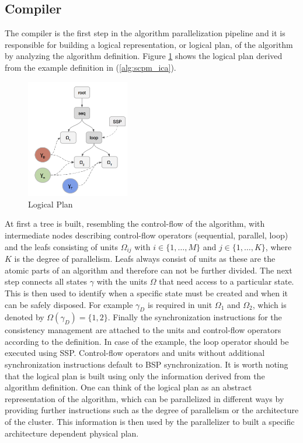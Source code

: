 \subsection{Compiler}
The compiler is the first step in the algorithm parallelization pipeline and it is responsible for building a logical representation, or logical plan, of the algorithm by analyzing the algorithm definition.
Figure \ref{fig:logical_plan} shows the logical plan derived from the example definition in (\ref{alg:scpm_ica}).
\begin{figure}[ht]
\centering
\includegraphics[width=0.4\textwidth]{img/logical_plan.png}
\caption{Logical Plan}
\label{fig:logical_plan}
\end{figure}
At first a tree is built, resembling the control-flow of the algorithm, with intermediate nodes describing control-flow operators (sequential, parallel, loop) and the leafs consisting of units $\Omega_{ij}$ with $i \in \{1, \ldots, M\}$ and $j \in \{1, \ldots, K\}$, where $K$ is the degree of parallelism.
Leafs always consist of units as these are the atomic parts of an algorithm and therefore can not be further divided.
The next step connects all states $\gamma$ with the units $\Omega$ that need access to a particular state.
This is then used to identify when a specific state must be created and when it can be safely disposed.
For example $\gamma_D$ is required in unit $\Omega_1$ and $\Omega_2$, which is denoted by $\Omega(\gamma_D) = \{1, 2\}$.
Finally the synchronization instructions for the consistency management are attached to the units and control-flow operators according to the definition.
In case of the example, the loop operator should be executed using SSP.
Control-flow operators and units without additional synchronization instructions default to BSP synchronization.
It is worth noting that the logical plan is built using only the information derived from the algorithm definition.
One can think of the logical plan as an abstract representation of the algorithm, which can be parallelized in different ways by providing further instructions such as the degree of parallelism or the architecture of the cluster.
This information is then used by the parallelizer to built a specific architecture dependent physical plan.

